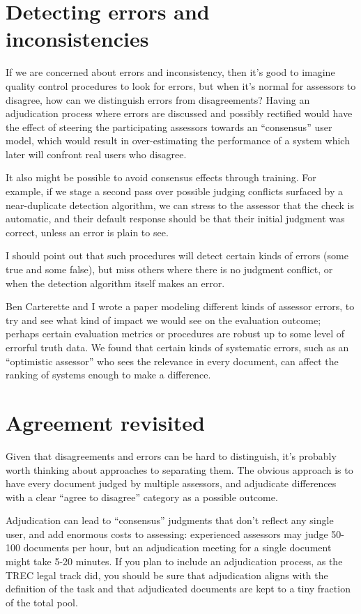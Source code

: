 \documentclass[nobib]{tufte-book}
\begin{document}
\section{Detecting errors and inconsistencies}

If we are concerned about errors and inconsistency, then it's good to imagine quality control procedures to look for errors, but when it's normal for assessors to disagree, how can we distinguish errors from disagreements?  Having an adjudication process where errors are discussed and possibly rectified would have the effect of steering the participating assessors towards an ``consensus'' user model, which would result in over-estimating the performance of a system which later will confront real users who disagree.

It also might be possible to avoid consensus effects through training.  For example, if we stage a second pass over possible judging conflicts surfaced by a near-duplicate detection algorithm, we can stress to the assessor that the check is automatic, and their default response should be that their initial judgment was correct, unless an error is plain to see.

I should point out that such procedures will detect certain kinds of errors (some true and some false), but miss others where there is no judgment conflict, or when the detection algorithm itself makes an error.

Ben Carterette and I wrote a paper modeling different kinds of assessor errors, to try and see what kind of impact we would see on the evaluation outcome; perhaps certain evaluation metrics or procedures are robust up to some level of errorful truth data.\autocite{carterette_effect_2010} We found that certain kinds of systematic errors, such as an ``optimistic assessor'' who sees the relevance in every document, can affect the ranking of systems enough to make a difference.

\section{Agreement revisited}

Given that disagreements and errors can be hard to distinguish, it's probably worth thinking about approaches to separating them.  The obvious approach is to have every document judged by multiple assessors, and adjudicate differences with a clear ``agree to disagree'' category as a possible outcome.

Adjudication can lead to ``consensus'' judgments that don't reflect any single user, and add enormous costs to assessing: experienced assessors may judge 50-100 documents per hour, but an adjudication meeting for a single document might take 5-20 minutes.  If you plan to include an adjudication process, as the TREC legal track did,\autocite{oard_evaluation_2010} you should be sure that adjudication aligns with the definition of the task and that adjudicated documents are kept to a tiny fraction of the total pool.
\end{document}

